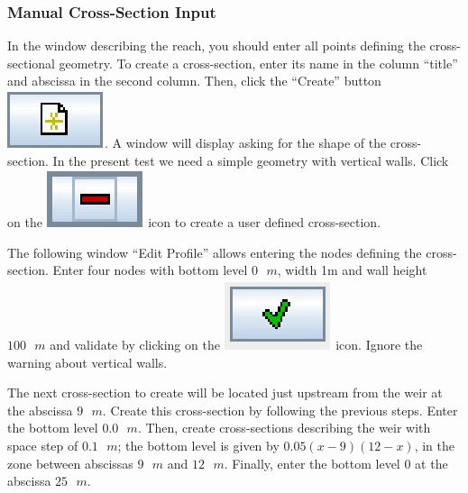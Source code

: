 \documentclass[a4paper,12pt]{article}
\begin{document}
\subsubsection{Manual Cross-Section Input  
}

\hspace{0.5cm} In the window describing the reach, you should enter all points
defining the cross-sectional geometry. To create a cross-section,
enter its name in the column {}``title'' and abscissa in the second column.
Then, click the {}``Create'' button \includegraphics[scale=0.6]{new}.
A window will display asking for the shape of the cross-section. In the present test we need
a simple geometry with vertical walls. Click on the \includegraphics[scale=0.6]{moins}
icon to create a user defined cross-section. 

\vspace{0.5cm}

The following window {}``Edit Profile'' allows entering the
nodes defining the cross-section. Enter four nodes with bottom level $0\mbox{ }m$, width 1m and wall height $100\mbox{ }m$ and validate
by clicking on the \includegraphics[scale=0.6]{valid}
icon. Ignore the warning about vertical walls.

\vspace{0.5cm}

The next cross-section to create will be located just upstream from the weir at the abscissa $9\mbox{ }m$. Create this cross-section by following the previous steps. Enter the bottom level $0.0\mbox{ }m$. Then, create cross-sections describing the weir with space step of $0.1\mbox{ }m$; the bottom level is given by $0.05(x-9)(12-x)$,
in the zone between abscissas $9\mbox{ }m$ and $12\mbox{ }m$. Finally, enter the bottom level $0$ at the abscissa $25\mbox{ }m$.
\end{document}
